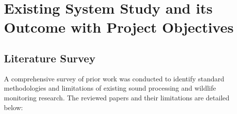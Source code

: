 \documentclass[11pt,a4paper,oneside]{report}
\begin{document}
\chapter{Existing System Study and its Outcome with Project Objectives}

\section{Literature Survey}
A comprehensive survey of prior work was conducted to identify standard methodologies and limitations of existing sound processing and wildlife monitoring research. The reviewed papers and their limitations are detailed below:
\end{document}
